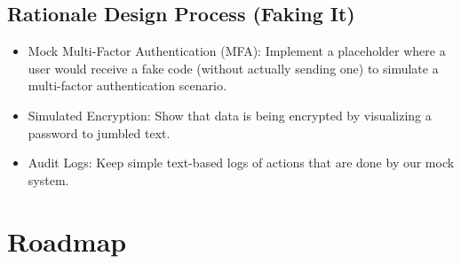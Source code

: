 \documentclass{article}
\begin{document}
\subsection{Rationale Design Process (Faking It)}
\begin{itemize}
    \item Mock Multi-Factor Authentication (MFA): Implement a placeholder where a user would receive a fake code (without actually sending one) to simulate a multi-factor authentication scenario.
    \item Simulated Encryption: Show that data is being encrypted by visualizing a password to jumbled text. 
    \item Audit Logs: Keep simple text-based logs of actions that are done by our mock system.
\end{itemize}

\section{Roadmap}
\end{document}
